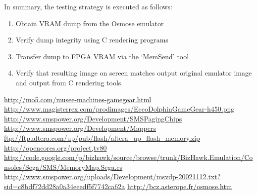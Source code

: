 \documentclass{article}
\begin{document}
In summary, the testing strategy is executed as follows:
\begin{enumerate}
    \item Obtain VRAM dump from the Osmose emulator
    \item Verify dump integrity using C rendering programs
    \item Transfer dump to FPGA VRAM via the `MemSend' tool
    \item Verify that resulting image on screen matches output original emulator image and output from C rendering tools.
\end{enumerate}


\newpage
\begin{thebibliography}{9}
     \url{http://mo5.com/musee-machines-gamegear.html}
     \url{http://www.magisterrex.com/prodimages/EccoDolphinGameGear-h450.png}
     \url{http://www.smspower.org/Development/SMSPagingChips}
     \url{http://www.smspower.org/Development/Mappers}
     \url{ftp://ftp.altera.com/up/pub/flash/altera_up_flash_memory.zip}
     \url{http://opencores.org/project,tv80}
     \url{http://code.google.com/p/bizhawk/source/browse/trunk/BizHawk.Emulation/Consoles/Sega/SMS/MemoryMap.Sega.cs}
     \url{http://www.smspower.org/uploads/Development/msvdp-20021112.txt?sid=c8bdf72dd28a0a34eeedf5f7742ca62a}
     \url{http://bcz.asterope.fr/osmose.htm}
\end{thebibliography}
\end{document}
